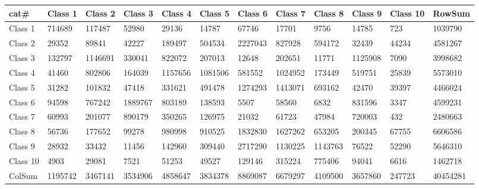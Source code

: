 ﻿\begin{table}[!ht]
    \centering
    \begin{tabular}{|l|l|l|l|l|l|l|l|l|l|l|l|}
    \hline
        cat\# & Class 1 & Class 2 & Class 3 & Class 4 & Class 5 & Class 6 & Class 7 & Class 8 & Class 9 & Class 10 & RowSum \\ \hline
        Class 1 & 714689 & 117487 & 52980 & 29136 & 14787 & 67746 & 17701 & 9756 & 14785 & 723 & 1039790 \\ \hline
        Class 2 & 29352 & 89841 & 42227 & 189497 & 504534 & 2227043 & 827928 & 594172 & 32439 & 44234 & 4581267 \\ \hline
        Class 3 & 132797 & 1146691 & 330041 & 822072 & 207013 & 12648 & 202651 & 11771 & 1125908 & 7090 & 3998682 \\ \hline
        Class 4 & 41460 & 802806 & 164039 & 1157656 & 1081506 & 581552 & 1024952 & 173449 & 519751 & 25839 & 5573010 \\ \hline
        Class 5 & 31282 & 101832 & 47418 & 331621 & 491478 & 1274293 & 1413071 & 693162 & 42470 & 39397 & 4466024 \\ \hline
        Class 6 & 94598 & 767242 & 1889767 & 803189 & 138593 & 5507 & 58560 & 6832 & 831596 & 3347 & 4599231 \\ \hline
        Class 7 & 60993 & 201077 & 890179 & 350265 & 126975 & 21032 & 61723 & 47984 & 720003 & 432 & 2480663 \\ \hline
        Class 8 & 56736 & 177652 & 99278 & 980998 & 910525 & 1832830 & 1627262 & 653205 & 200345 & 67755 & 6606586 \\ \hline
        Class 9 & 28932 & 33432 & 11456 & 142960 & 309440 & 2717290 & 1130225 & 1143763 & 76522 & 52290 & 5646310 \\ \hline
        Class 10 & 4903 & 29081 & 7521 & 51253 & 49527 & 129146 & 315224 & 775406 & 94041 & 6616 & 1462718 \\ \hline
        ColSum & 1195742 & 3467141 & 3534906 & 4858647 & 3834378 & 8869087 & 6679297 & 4109500 & 3657860 & 247723 & 40454281 \\ \hline
    \end{tabular}
\end{table}